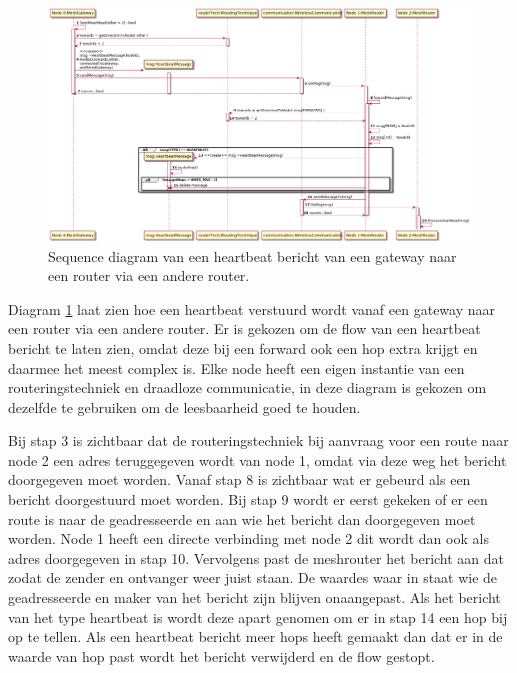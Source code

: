 \documentclass[a4paper, 11pt, oneside]{report}
\begin{document}
\begin{figure}[H]
	\begin{center}\includegraphics[width=\linewidth]{UML/out/Communication/Sequence/ForwardHeartbeat/ForwardHeartbeat.png}\end{center}
	\caption{Sequence diagram van een heartbeat bericht van een gateway naar een router via een andere router.}
	\label{fig:communication:sequence:sequence:heartbeatgateway->router->router}
\end{figure}
Diagram \ref{fig:communication:sequence:sequence:heartbeatgateway->router->router} laat zien hoe een heartbeat verstuurd wordt vanaf een gateway naar een router via een andere router.
Er is gekozen om de flow van een heartbeat bericht te laten zien, omdat deze bij een forward ook een hop extra krijgt en daarmee het meest complex is.
Elke node heeft een eigen instantie van een routeringstechniek en draadloze communicatie, in deze diagram is gekozen om dezelfde te gebruiken om de leesbaarheid goed te houden.

Bij stap 3 is zichtbaar dat de routeringstechniek bij aanvraag voor een route naar node 2 een adres teruggegeven wordt van node 1, omdat via deze weg het bericht doorgegeven moet worden.
Vanaf stap 8 is zichtbaar wat er gebeurd als een bericht doorgestuurd moet worden.
Bij stap 9 wordt er eerst gekeken of er een route is naar de geadresseerde en aan wie het bericht dan doorgegeven moet worden.
Node 1 heeft een directe verbinding met node 2 dit wordt dan ook als adres doorgegeven in stap 10.
Vervolgens past de meshrouter het bericht aan dat zodat de zender en ontvanger weer juist staan. 
De waardes waar in staat wie de geadresseerde en maker van het bericht zijn blijven onaangepast.
Als het bericht van het type heartbeat is wordt deze apart genomen om er in stap 14 een hop bij op te tellen.
Als een heartbeat bericht meer hops heeft gemaakt dan dat er in de waarde van hop past wordt het bericht verwijderd en de flow gestopt.
\end{document}
